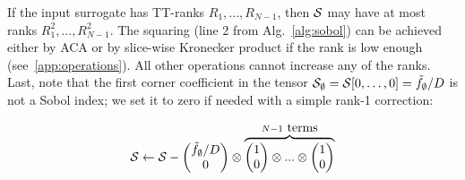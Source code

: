 \documentclass[review, twocolumn]{svjour3}          %
\begin{document}
If the input surrogate has TT-ranks $R_1, ..., R_{N-1}$, then $\mathcal{S}$ may have at most ranks $R_1^2, ..., R_{N-1}^2$. The squaring (line 2 from Alg.~\ref{alg:sobol}) can be achieved either by ACA or by slice-wise Kronecker product if the rank is low enough (see~\ref{app:operations}). All other operations cannot increase any of the ranks. Last, note that the first corner coefficient in the tensor $\mathcal{S}_{\emptyset} = \mathcal{S}[0,\dots,0] = \tilde{f}_{\emptyset}/D$ is not a Sobol index; we set it to zero if needed with a simple rank-1 correction:

\begin{equation}
\mathcal{S} \leftarrow \mathcal{S} - \begin{pmatrix}\tilde{f}_{\emptyset}/D \\ 0\end{pmatrix} \otimes \overbrace{\begin{pmatrix}1 \\ 0\end{pmatrix} \otimes ... \otimes \begin{pmatrix}1 \\ 0\end{pmatrix}}^{N-1\mbox{ terms}}
\end{equation} 

%


\end{document}
